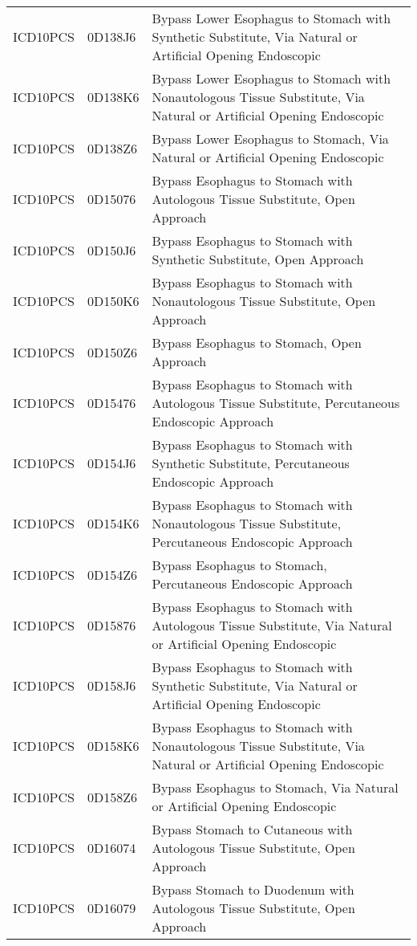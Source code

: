 \begin{longtable}{p{}p{}p{}}
  ICD10PCS & 0D138J6 & Bypass Lower Esophagus to Stomach with Synthetic Substitute, Via Natural or Artificial Opening Endoscopic \\ 
  ICD10PCS & 0D138K6 & Bypass Lower Esophagus to Stomach with Nonautologous Tissue Substitute, Via Natural or Artificial Opening Endoscopic \\ 
  ICD10PCS & 0D138Z6 & Bypass Lower Esophagus to Stomach, Via Natural or Artificial Opening Endoscopic \\ 
  ICD10PCS & 0D15076 & Bypass Esophagus to Stomach with Autologous Tissue Substitute, Open Approach \\ 
  ICD10PCS & 0D150J6 & Bypass Esophagus to Stomach with Synthetic Substitute, Open Approach \\ 
  ICD10PCS & 0D150K6 & Bypass Esophagus to Stomach with Nonautologous Tissue Substitute, Open Approach \\ 
  ICD10PCS & 0D150Z6 & Bypass Esophagus to Stomach, Open Approach \\ 
  ICD10PCS & 0D15476 & Bypass Esophagus to Stomach with Autologous Tissue Substitute, Percutaneous Endoscopic Approach \\ 
  ICD10PCS & 0D154J6 & Bypass Esophagus to Stomach with Synthetic Substitute, Percutaneous Endoscopic Approach \\ 
  ICD10PCS & 0D154K6 & Bypass Esophagus to Stomach with Nonautologous Tissue Substitute, Percutaneous Endoscopic Approach \\ 
  ICD10PCS & 0D154Z6 & Bypass Esophagus to Stomach, Percutaneous Endoscopic Approach \\ 
  ICD10PCS & 0D15876 & Bypass Esophagus to Stomach with Autologous Tissue Substitute, Via Natural or Artificial Opening Endoscopic \\ 
  ICD10PCS & 0D158J6 & Bypass Esophagus to Stomach with Synthetic Substitute, Via Natural or Artificial Opening Endoscopic \\ 
  ICD10PCS & 0D158K6 & Bypass Esophagus to Stomach with Nonautologous Tissue Substitute, Via Natural or Artificial Opening Endoscopic \\ 
  ICD10PCS & 0D158Z6 & Bypass Esophagus to Stomach, Via Natural or Artificial Opening Endoscopic \\ 
  ICD10PCS & 0D16074 & Bypass Stomach to Cutaneous with Autologous Tissue Substitute, Open Approach \\ 
  ICD10PCS & 0D16079 & Bypass Stomach to Duodenum with Autologous Tissue Substitute, Open Approach \\ 

\end{longtable}
